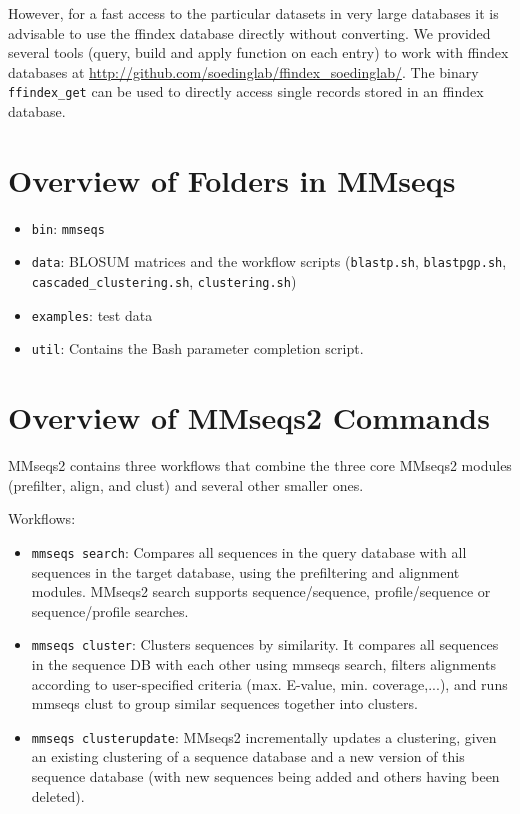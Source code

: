 \documentclass[11pt,a4paper]{scrreprt}
\begin{document}
However, for a fast access to the particular datasets in very large databases it is advisable to use the ffindex database directly without converting. We provided several tools (query, build and apply function on each entry) to work with ffindex databases at \url{http://github.com/soedinglab/ffindex_soedinglab/}. The binary \texttt{ffindex\_get} can be used to directly access single records stored in an ffindex database.
\section{Overview of Folders in MMseqs}
\begin{itemize}
\item \texttt{bin}: \texttt{mmseqs}
\item \texttt{data}: BLOSUM matrices and the workflow scripts (\texttt{blastp.sh}, \texttt{blastpgp.sh}, \texttt{cascaded\_clustering.sh}, \texttt{clustering.sh})
\item \texttt{examples}: test data 
\item \texttt{util}: Contains the Bash parameter completion script.
\end{itemize}

\section{Overview of MMseqs2 Commands}
MMseqs2 contains three workflows that combine the three core MMseqs2 modules (prefilter, align, and clust) and several other smaller ones. 

Workflows:
\begin{itemize}
\item \texttt{mmseqs search}: Compares all sequences in the query database with all sequences in the target database, using the prefiltering and alignment modules. MMseqs2 search supports sequence/sequence, profile/sequence or sequence/profile searches.
\item \texttt{mmseqs cluster}:  Clusters sequences by similarity. It compares all sequences in the sequence DB with each other using mmseqs search, filters alignments according to user-specified criteria (max. E-value, min. coverage,...),   and runs mmseqs clust to group similar sequences together into clusters.
\item \texttt{mmseqs clusterupdate}: MMseqs2 incrementally updates a clustering, given an existing clustering of a sequence database and a new version of this sequence database (with new sequences being added and others having been deleted).
\end{itemize}
\end{document}

